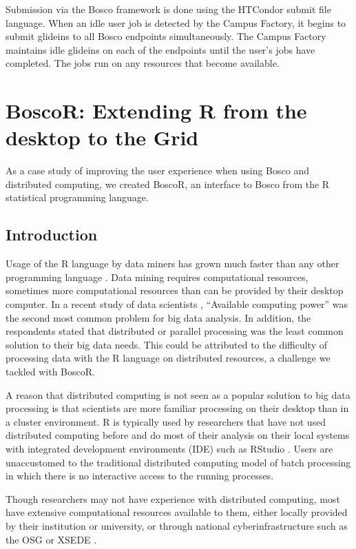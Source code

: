 Submission via the Bosco framework is done using the HTCondor submit file language.  When an idle user job is detected by the Campus Factory, it begins to submit glideins to all Bosco endpoints simultaneously.  The Campus Factory maintains idle glideins on each of the endpoints until the user's jobs have completed.  The jobs run on any resources that become available.


\section{BoscoR: Extending R from the desktop to the Grid}

As a case study of improving the user experience when using Bosco and distributed computing, we created BoscoR, an interface to Bosco from the R statistical programming language.  %


\subsection{Introduction}
Usage of the R language \cite{team2012r} by data miners has grown much faster than any other programming language \cite{rexer2013, KDnuggets2013}.  Data mining requires computational resources, sometimes more computational resources than can be provided by their desktop computer.  In a recent study of data scientists \cite{rexer2013}, ``Available computing power'' was the second most common problem for big data analysis.  In addition, the respondents stated that distributed or parallel processing was the least common solution to their big data needs.  This could be attributed to the difficulty of processing data with the R language on distributed resources, a challenge we tackled with BoscoR.

A reason that distributed computing is not seen as a popular solution to big data processing is that scientists are more familiar processing on their desktop than in a cluster environment.  R is typically used by researchers that have not used distributed computing before and do most of their analysis on their local systems with integrated development environments (IDE) such as RStudio \cite{racine2012rstudio}.  Users are unaccustomed to the traditional distributed computing model of batch processing in which there is no interactive access to the running processes.

Though researchers may not have experience with distributed computing, most have extensive computational resources available to them, either locally provided by their institution or university, or through national cyberinfrastructure such as the OSG \cite{pordes2007open} or XSEDE \cite{xsede}.



